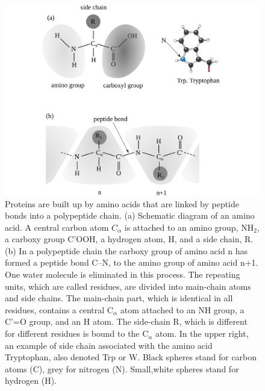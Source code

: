 \begin{subappendices}
       \begin{figure}
        \centerline{\includegraphics*[width=15cm,angle=0]{nutshell/figs/fig3D5}}
        \caption{Proteins are built up by amino acids that are linked by peptide bonds into a polypeptide chain. (a) Schematic diagram of an amino acid. A central carbon atom $C_\alpha$ is attached to an amino group, NH$_2$, a carboxy group C'OOH, a hydrogen atom, H, and a side chain, R. (b) In a polypeptide chain the carboxy group of amino acid n has formed a peptide bond C--N, to the amino group of amino acid n+1. One water molecule is eliminated in this process. The repeating units, which are called residues, are divided into main-chain atoms and side chains. The main-chain part, which is identical in all residues, contains a central C$_\alpha$ atom attached to an NH group, a C'=O group, and an H atom. The side-chain R, which is different for different residues is bound to the C$_\alpha$ atom. In the upper right, an example of side chain associated with the amino acid Tryptophan, also denoted Trp or W. Black spheres stand for carbon atoms (C), grey for nitrogen (N). Small,white spheres stand for hydrogen (H).}\label{fig2.D.7}
        \end{figure}
       
  
 
 
 
 
 
 
 

\end{subappendices}
